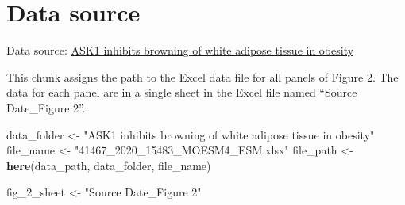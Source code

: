 \documentclass[]{book}
\newenvironment{Shaded}{\begin{snugshade}}{\end{snugshade}}
\newcommand{\CommentTok}[1]{\textcolor[rgb]{0.56,0.35,0.01}{\textit{#1}}}
\newcommand{\DataTypeTok}[1]{\textcolor[rgb]{0.13,0.29,0.53}{#1}}
\newcommand{\DecValTok}[1]{\textcolor[rgb]{0.00,0.00,0.81}{#1}}
\newcommand{\KeywordTok}[1]{\textcolor[rgb]{0.13,0.29,0.53}{\textbf{#1}}}
\newcommand{\NormalTok}[1]{#1}
\newcommand{\OperatorTok}[1]{\textcolor[rgb]{0.81,0.36,0.00}{\textbf{#1}}}
\newcommand{\OtherTok}[1]{\textcolor[rgb]{0.56,0.35,0.01}{#1}}
\newcommand{\StringTok}[1]{\textcolor[rgb]{0.31,0.60,0.02}{#1}}
\begin{document}
\begin{Shaded}
\end{Shaded}

\hypertarget{data-source}{%
\section{Data source}\label{data-source}}

Data source: \href{https://www.nature.com/articles/s41467-020-15483-7}{ASK1 inhibits browning of white adipose tissue in obesity}

This chunk assigns the path to the Excel data file for all panels of Figure 2. The data for each panel are in a single sheet in the Excel file named ``Source Date\_Figure 2''.

\begin{Shaded}
\begin{Highlighting}[]
\NormalTok{data_folder <-}\StringTok{ "ASK1 inhibits browning of white adipose tissue in obesity"}
\NormalTok{file_name <-}\StringTok{ "41467_2020_15483_MOESM4_ESM.xlsx"}
\NormalTok{file_path <-}\StringTok{ }\KeywordTok{here}\NormalTok{(data_path, data_folder, file_name)}
  
\NormalTok{fig_}\DecValTok{2}\NormalTok{_sheet <-}\StringTok{ "Source Date_Figure 2"}
\end{Highlighting}
\end{Shaded}
\end{document}
